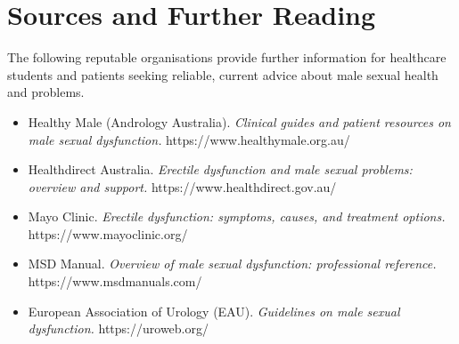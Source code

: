 \section*{Sources and Further Reading}
The following reputable organisations provide further information for healthcare students and patients seeking reliable, current advice about male sexual health and problems.

\begin{itemize}
    \item Healthy Male (Andrology Australia). \textit{Clinical guides and patient resources on male sexual dysfunction.} https://www.healthymale.org.au/
    \item Healthdirect Australia. \textit{Erectile dysfunction and male sexual problems: overview and support.} https://www.healthdirect.gov.au/
    \item Mayo Clinic. \textit{Erectile dysfunction: symptoms, causes, and treatment options.} https://www.mayoclinic.org/
    \item MSD Manual. \textit{Overview of male sexual dysfunction: professional reference.} https://www.msdmanuals.com/
    \item European Association of Urology (EAU). \textit{Guidelines on male sexual dysfunction.} https://uroweb.org/
\end{itemize}
